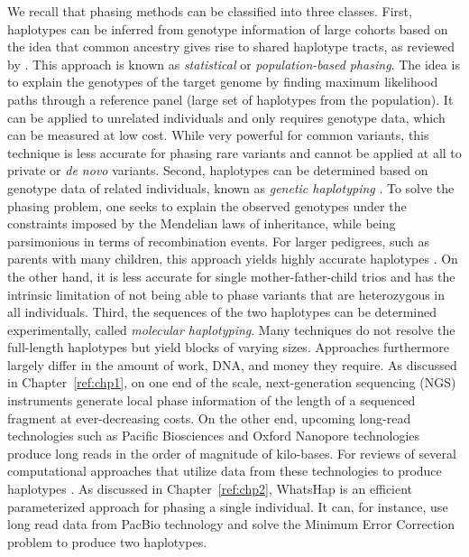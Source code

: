 We recall that phasing methods can be classified into three classes. 
First, haplotypes can be inferred from genotype information of large cohorts based on the idea that common ancestry gives rise to shared haplotype tracts, as reviewed by \cite{Browning2011, loh2016fast, loh2016reference}.
This approach is known as \emph{statistical} or \emph{population-based phasing}.
The idea is to explain the genotypes of the target genome by finding maximum likelihood paths through a reference panel (large set of haplotypes from the population).
It can be applied to unrelated individuals and only requires genotype data, which can be measured at low cost.
While very powerful for common variants, this technique is less accurate for phasing rare variants and cannot be applied at all to private or \textit{de novo} variants.
%
Second, haplotypes can be determined based on genotype data of related individuals, known as \emph{genetic haplotyping} \citep{Glusman2014}.
To solve the phasing problem, one seeks to explain the observed genotypes under the constraints imposed by the Mendelian laws of inheritance, while being parsimonious in terms of recombination events.
For larger pedigrees, such as parents with many children, this approach yields highly accurate haplotypes \citep{Roach2011, abecasis2002merlin, williams2010rapid}.
On the other hand, it is less accurate for single mother-father-child trios and has the intrinsic limitation of not being able to phase variants that are heterozygous in all individuals.
%
Third, the sequences of the two haplotypes can be determined experimentally, called \emph{molecular haplotyping}.
Many techniques do not resolve the full-length haplotypes but yield blocks of varying sizes.
Approaches furthermore largely differ in the amount of work, DNA, and money they require.
As discussed in Chapter~\ref{ref:chp1}, on one end of the scale, next-generation sequencing (NGS) instruments generate local phase information of the length of a sequenced fragment at ever-decreasing costs.
On the other end, upcoming long-read technologies such as Pacific Biosciences and Oxford Nanopore technologies produce long reads in the order of magnitude of kilo-bases.
For reviews of several computational approaches that utilize data from these technologies to produce haplotypes \citep{rhee2016survey, sedlazeck2018piercing}.
As discussed in Chapter~\ref{ref:chp2}, WhatsHap is an efficient parameterized approach for phasing a single individual.
It can, for instance, use long read data from PacBio technology and solve the Minimum Error Correction problem to produce two haplotypes.

